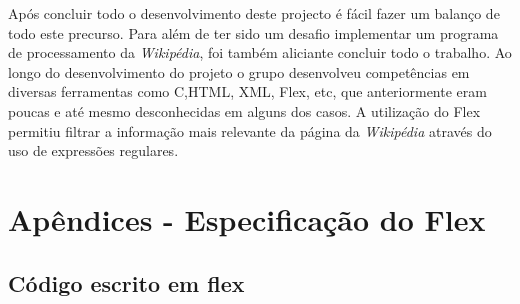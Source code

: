 \documentclass[11pt, a4paper, oneside]{article}
\begin{document}
Após concluir todo o desenvolvimento deste projecto é fácil fazer um balanço de todo este precurso. Para além de ter sido um desafio implementar um programa de processamento da \textit{Wikipédia}, foi também aliciante concluir todo o trabalho.
Ao longo do desenvolvimento do projeto o grupo desenvolveu competências em diversas ferramentas como C,HTML, XML, Flex, etc, que anteriormente eram poucas e até mesmo desconhecidas em alguns dos casos. 
A utilização do Flex permitiu filtrar a informação mais relevante da página da \textit{Wikipédia} através do uso de expressões regulares. 
\newpage
\section{Apêndices - Especificação do Flex}

\subsection{Código escrito em flex}
\end{document}
